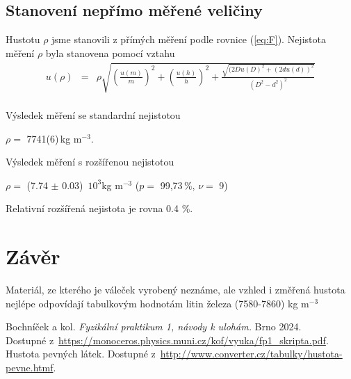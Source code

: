 \documentclass[a4paper,11pt]{article}
\newcommand{\vsn}[4]{\ensuremath{#1 =} #2(#3)\,#4}
\newcommand{\vrn}[6]{\ensuremath{#1 =} (#2 $\pm$ #3)\,#4 ($p=$ #5\,\%, $\nu=$ #6)}
\begin{document}
\subsection{Stanovení nepřímo měřené veličiny}
Hustotu $\rho$ jsme stanovili z přímých měření podle rovnice (\ref{eq:F}). 
Nejistota měření $\rho$ byla stanovena pomocí vztahu
\begin{eqnarray}
  u(\rho) &=& \rho \sqrt{(\frac{u(m)}{m})^2 + (\frac{u(h)}{h})^2 + \frac{\sqrt{(2Du(D)^2 + (2du(d))^2 }}{(D^2-d^2)^2}} \\
\end{eqnarray}

Výsledek měření se standardní nejistotou

\begin{center}
\vsn{\rho}{7741}{6}{kg m$^{-3}$}.
\end{center}

Výsledek měření s rozšířenou nejistotou

\begin{center}
  \vrn{\rho}{7.74}{0.03}{ $10^3$kg m$^{-3}$ }{99,73}{9}
\end{center}
Relativní rozšířená nejistota je rovna 0.4 \%.

\section{Závěr}
Materiál, ze kterého je váleček vyrobený neznáme, ale vzhled i změřená hustota nejlépe odpovídají 
tabulkovým hodnotám litin železa (7580-7860) kg m$^{-3}$


\begin{thebibliography}{0}
 Bochníček a kol. \textit{Fyzikální praktikum 1, návody k ulohám.} Brno 2024.\\ Dostupné z~\url{https://monoceros.physics.muni.cz/kof/vyuka/fp1_skripta.pdf}.   
 Hustota pevných látek. Dostupné z~\url{http://www.converter.cz/tabulky/hustota-pevne.htmf}.   

\end{thebibliography}


\end{document}
